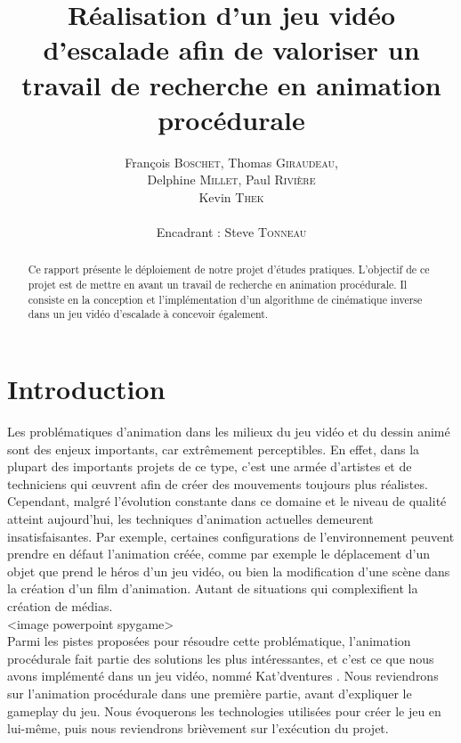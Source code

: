 \documentclass[a4paper,11pt]{article}
\title{ \textbf{Réalisation d'un jeu vidéo d'escalade afin de valoriser un travail de recherche en 
animation procédurale} }
\author{François \textsc{Boschet}, Thomas \textsc{Giraudeau}, \\
        Delphine \textsc{Millet}, Paul \textsc{Rivière} \\
        Kevin \textsc{Thek} \\
        \\
        Encadrant : Steve \textsc{Tonneau}}
\date{}                    %
\begin{document}
          

\maketitle                 %
\thispagestyle{empty}      %



\begin{abstract}
Ce rapport présente le déploiement de notre projet d'études pratiques. L'objectif de ce projet est de mettre en avant un travail de recherche en animation procédurale. Il consiste en la conception et l'implémentation d'un algorithme de cinématique inverse dans un jeu vidéo d'escalade à concevoir également.

\end{abstract} 


\section{Introduction}  

Les problématiques d'animation dans les milieux du jeu vidéo et du dessin animé sont des enjeux importants, car extrêmement perceptibles. En effet, dans la plupart des importants projets de ce type, c'est une armée d'artistes et de techniciens qui {\oe}uvrent afin de créer des mouvements toujours plus réalistes. \\
Cependant, malgré l'évolution constante dans ce domaine et le niveau de qualité atteint aujourd'hui, les techniques d'animation actuelles demeurent insatisfaisantes. Par exemple, certaines configurations de l'environnement peuvent prendre en défaut l'animation créée, comme par exemple le déplacement d'un objet que prend le héros d'un jeu vidéo, ou bien la modification d'une scène dans la création d'un film d'animation. Autant de situations qui complexifient la création de médias.\\   
<image powerpoint spygame>\\
Parmi les pistes proposées pour résoudre cette problématique, l'animation procédurale fait partie des solutions les plus intéressantes, et c'est ce que nous avons implémenté dans un jeu vidéo, nommé \og Kat'dventures \fg{}  . Nous reviendrons sur l'animation procédurale dans une première partie, avant d'expliquer le gameplay du jeu. Nous évoquerons les technologies utilisées pour créer le jeu en lui-même, puis nous reviendrons brièvement sur l'exécution du projet.
\end{document}
